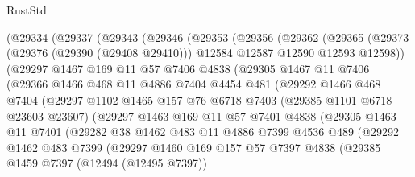 \begin{lexlean}{RustStd}
\begin{coremodule}
    (@29334
      (@29337
        (@29343
          (@29346
            (@29353
              (@29356
                (@29362
                  (@29365
                    (@29373 (@29376 (@29390 (@29408 @29410))) @12584 @12587 @12590 @12593 @12598))
                  (@29297
                    @1467
                    @169
                    @11
                    @57
                    @7406
                    @4838
                    (@29305
                      @1467
                      @11
                      @7406
                      (@29366
                        @1466
                        @468
                        @11
                        @4886
                        @7404
                        @4454
                        @481
                        (@29292
                          @1466
                          @468
                          @7404
                          (@29297
                            @1102
                            @1465
                            @157
                            @76
                            @6718
                            @7403
                            (@29385 @1101 @6718 @23603 @23607)
                            (@29297
                              @1463
                              @169
                              @11
                              @57
                              @7401
                              @4838
                              (@29305
                                @1463
                                @11
                                @7401
                                (@29282
                                  @38
                                  @1462
                                  @483
                                  @11
                                  @4886
                                  @7399
                                  @4536
                                  @489
                                  (@29292
                                    @1462
                                    @483
                                    @7399
                                    (@29297
                                      @1460
                                      @169
                                      @157
                                      @57
                                      @7397
                                      @4838
                                      (@29385
                                        @1459
                                        @7397
                                        (@12494 (@12495 @7397))

\end{coremodule}
\end{lexlean}
